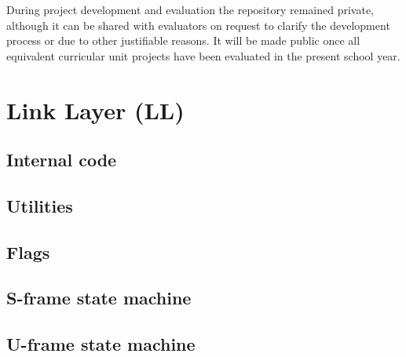 \documentclass[a4paper, 11pt]{report}
\begin{document}
During project development and evaluation the repository remained private, although it can be shared with evaluators on request to clarify the development process or due to other justifiable reasons. It will be made public once all equivalent curricular unit projects have been evaluated in the present school year.

\fancyhfoffset[E,O]{0pt}

\section{Link Layer (LL)}



\subsection{Internal code}



\subsection{Utilities}



\begin{landscape}
\subsection{Flags}

\end{landscape}

\subsection{S-frame state machine}



\subsection{U-frame state machine}


\end{document}

